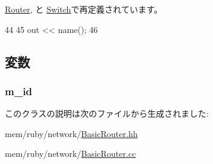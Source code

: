\hyperlink{classRouter_ac55fe386a101fbae38c716067c9966a0}{Router}, と \hyperlink{classSwitch_ac55fe386a101fbae38c716067c9966a0}{Switch}で再定義されています。


\begin{DoxyCode}
44 {
45     out << name();
46 }
\end{DoxyCode}


\subsection{変数}
\hypertarget{classBasicRouter_ac970dc89366c6c0cb38a2f944b3672b6}{
\subsubsection[{m\_\-id}]{ {\bf m\_\-id}}}
\label{classBasicRouter_ac970dc89366c6c0cb38a2f944b3672b6}


このクラスの説明は次のファイルから生成されました:\begin{DoxyCompactItemize}
\item 
mem/ruby/network/\hyperlink{BasicRouter_8hh}{BasicRouter.hh}\item 
mem/ruby/network/\hyperlink{BasicRouter_8cc}{BasicRouter.cc}\end{DoxyCompactItemize}

